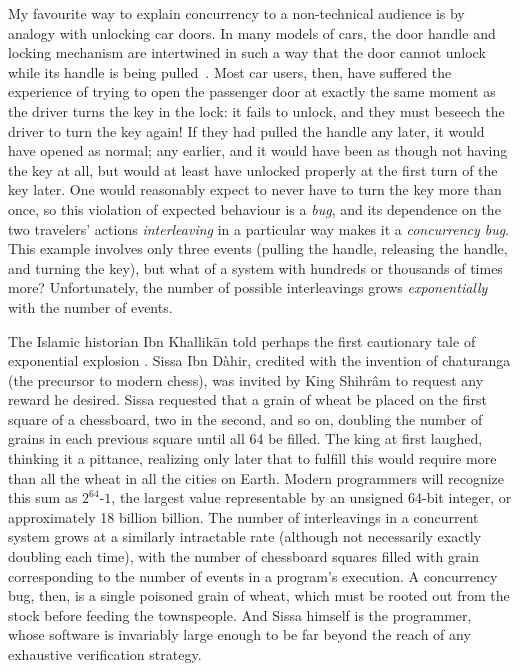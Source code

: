 {My favourite way to explain concurrency to a non-technical audience
is by analogy with unlocking car doors.
In many %
models of cars, the door handle and locking mechanism are intertwined
in such a way that the door cannot unlock while its handle is being pulled~\cite{car-doors}.
Most car users, then,
have suffered the experience of
trying to open the passenger door
at exactly the same moment as the driver turns the key in the lock:
it fails to unlock, and
they must beseech the driver to turn the key again!
If they had pulled the handle any later, it would have opened as normal;
any earlier, and it would have been as though not having the key at all,
but would at least have unlocked properly at the first turn of the key later.
One would reasonably expect to never have to turn the key more than once,
so this violation of expected behaviour is a {\em bug},
and its dependence on the two travelers' actions {\em interleaving}
in a particular way
makes it a {\em concurrency bug}.
This example involves only three events (pulling the handle, releasing the handle, and turning the key),
but what of a system with hundreds or thousands of times more?
Unfortunately, the number of possible interleavings grows {\em exponentially} with the number of events.

The Islamic historian Ibn Khallik\={a}n told perhaps the first cautionary tale of exponential explosion
\cite{ibn-khallikan,khallikān1868ibn}.
Sissa Ibn D\`{a}hir,
credited with the invention of chaturanga (the precursor to modern chess),
was invited by King Shihr\^{a}m to request any reward he desired.
Sissa requested that a grain of wheat be placed on the first square of a chessboard,
two in the second, and so on, doubling the number of grains in each previous square until all 64 be filled.
The king at first laughed, thinking it a pittance,
realizing only later that to fulfill this would require
more than all the wheat in all the cities on Earth.
Modern programmers will recognize this sum as $2^{64}$-$1$,
the largest value representable by an unsigned 64-bit integer,
or approximately 18 billion billion.
The number of interleavings in a concurrent system grows at a similarly intractable rate
(although not necessarily exactly doubling each time),
with the number of chessboard squares filled with grain corresponding to the number of events in a program's execution.
A concurrency bug, then, is a single poisoned grain of wheat,
which must be rooted out from the stock before feeding the townspeople.
And Sissa himself is the programmer,
whose software is invariably large enough to be far beyond the reach of any exhaustive verification strategy.
}

